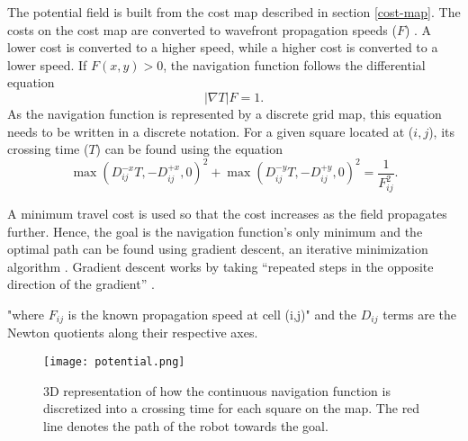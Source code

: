 The potential field is built from the cost map described in section \ref{cost-map}. The costs on the cost map are converted to wavefront propagation speeds ($F$) \parencite{philippsenInterpolatedDynamicNavigation2005}. A lower cost is converted to a higher speed, while a higher cost is converted to a lower speed. If $F(x,y)>0$, the navigation function follows the differential equation
\[
    |\nabla T|F=1.
\]
As the navigation function is represented by a discrete grid map, this equation needs to be written in a discrete notation. For a given square located at ($i,j$), its crossing time ($T$) can be found using the equation
\[
    \max(D_{ij}^{-x}T,-D_{ij}^{+x},0)^2+\max(D_{ij}^{-y}T,-D_{ij}^{+y},0)^2=\frac{1}{F_{ij}^2}.
\]





\parencite{macenskiDesksROSMaintainers2023}



A minimum travel cost is used so that the cost increases as the field propagates further. Hence, the goal is the navigation function's only minimum and the optimal path can be found using gradient descent, an iterative minimization algorithm \parencite{GradientDescent2024}. Gradient descent works by taking ``repeated steps in the opposite direction of the gradient'' \parencite{GradientDescent2024}.


"where $F_{ij}$ is the known propagation speed at cell (i,j)" and the $D_{ij}$ terms are the Newton quotients along their respective axes.

\begin{figure}[htb]
    \texttt{[image: potential.png]}
    \centering
    \caption{3D representation of how the continuous navigation function is discretized into a crossing time for each square on the map. The red line denotes the path of the robot towards the goal.}
    \label{fig:potential}
\end{figure}